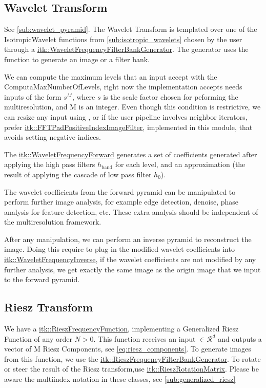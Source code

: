 \documentclass{InsightArticle}
\newcommand{\github}[1]{\href{https://github.com/phcerdan/ITKIsotropicWavelets/blob/master/include/itk#1.h}{itk::#1}}
\theoremstyle{definition}
\begin{document}
\subsection{Wavelet Transform}
\label{sub:wavelet_transform_impl}

See \autoref{sub:wavelet_pyramid}. The Wavelet Transform is templated over one of the IsotropicWavelet functions from \autoref{sub:isotropic_wavelets} chosen by the user through a \github{WaveletFrequencyFilterBankGenerator}. The generator uses the function to generate an image or a filter bank.

We can compute the maximum levels that an input accept with the ComputaMaxNumberOfLevels, right now the implementation accepts needs inputs of the form $s^M$, where $s$ is the scale factor chosen for peforming the multiresolution, and M is an integer. Even though this condition is restrictive, we can resize any input using , or if the user pipeline involves neighbor iterators, prefer \github{FFTPadPositiveIndexImageFilter}, implemented in this module, that avoids setting negative indices.

The \github{WaveletFrequencyForward} generates a set of coefficients generated after applying the high pass filters $h_{\text{band}}$ for each level, and an approximation (the result of applying the cascade of low pass filter $h_0$).

The wavelet coefficients from the forward pyramid can be manipulated to perform further image analysis, for example edge detection, denoise, phase analysis for feature detection, etc. These extra analysis should be independent of the multiresolution framework.

After any manipulation, we can perform an inverse pyramid to reconstruct the image. Doing this require to plug in the modified wavelet coefficients into \github{WaveletFrequencyInverse}, if the wavelet coefficients are not modified by any further analysis, we get exactly the same image as the origin image that we input to the forward pyramid.

\subsection{Riesz Transform}
\label{sub:riesz_transform_impl}

We have a \github{RieszFrequencyFunction}, implementing a Generalized Riesz Function \cite{unser_steerable_2011} of any order $N>0$. This function receives an input $\in \mathcal{R}^d$ and outputs a vector of M Riesz Components, see \autoref{eq:riesz_components}. To generate images from this function, we use the \github{RieszFrequencyFilterBankGenerator}. To rotate or steer the result of the Riesz transform,use \github{RieszRotationMatrix}. Please be aware the multiindex notation in these classes, see \autoref{sub:generalized_riesz}
\end{document}

